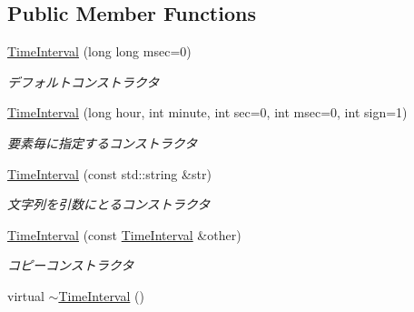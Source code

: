 \subsection*{Public Member Functions}
\begin{DoxyCompactItemize}
\item 
\hypertarget{classskl_1_1_time_interval_adfa93f83372d9d25e27282ed38e35345}{}\label{classskl_1_1_time_interval_adfa93f83372d9d25e27282ed38e35345} 
\hyperlink{classskl_1_1_time_interval_adfa93f83372d9d25e27282ed38e35345}{Time\+Interval} (long long msec=0)
\begin{DoxyCompactList}\small\item\em デフォルトコンストラクタ \end{DoxyCompactList}\item 
\hypertarget{classskl_1_1_time_interval_a1d2f4f99ab2358c6c2c9d812835e50ce}{}\label{classskl_1_1_time_interval_a1d2f4f99ab2358c6c2c9d812835e50ce} 
\hyperlink{classskl_1_1_time_interval_a1d2f4f99ab2358c6c2c9d812835e50ce}{Time\+Interval} (long hour, int minute, int sec=0, int msec=0, int sign=1)
\begin{DoxyCompactList}\small\item\em 要素毎に指定するコンストラクタ \end{DoxyCompactList}\item 
\hypertarget{classskl_1_1_time_interval_aa0aa3a4fa4887826b0d194036891bb10}{}\label{classskl_1_1_time_interval_aa0aa3a4fa4887826b0d194036891bb10} 
\hyperlink{classskl_1_1_time_interval_aa0aa3a4fa4887826b0d194036891bb10}{Time\+Interval} (const std\+::string \&str)
\begin{DoxyCompactList}\small\item\em 文字列を引数にとるコンストラクタ \end{DoxyCompactList}\item 
\hypertarget{classskl_1_1_time_interval_a62581176e8c9c785d8a4c0a23ace8605}{}\label{classskl_1_1_time_interval_a62581176e8c9c785d8a4c0a23ace8605} 
\hyperlink{classskl_1_1_time_interval_a62581176e8c9c785d8a4c0a23ace8605}{Time\+Interval} (const \hyperlink{classskl_1_1_time_interval}{Time\+Interval} \&other)
\begin{DoxyCompactList}\small\item\em コピーコンストラクタ \end{DoxyCompactList}\item 
\hypertarget{classskl_1_1_time_interval_ab9e4f540a894261106ac579d1d409b23}{}\label{classskl_1_1_time_interval_ab9e4f540a894261106ac579d1d409b23} 
virtual \hyperlink{classskl_1_1_time_interval_ab9e4f540a894261106ac579d1d409b23}{$\sim$\+Time\+Interval} ()

\end{DoxyCompactItemize}
